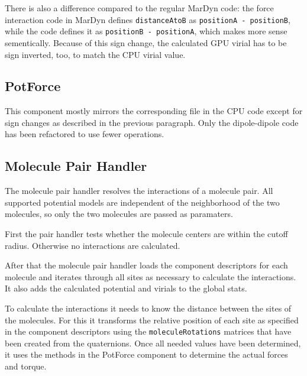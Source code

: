 There is also a difference compared to the regular MarDyn code: the force interaction code in MarDyn defines \lstinline!distanceAtoB! as \lstinline!positionA - positionB!, while the \cuda{} code defines it as \lstinline!positionB - positionA!, which makes more sense sementically. Because of this sign change, the calculated GPU virial has to be sign inverted, too, to match the CPU virial value.

\subsection{PotForce}
This component mostly mirrors the corresponding  file in the CPU code except for sign changes as described in the previous paragraph. Only the dipole-dipole code has been refactored to use fewer operations.

\subsection{Molecule Pair Handler}
The molecule pair handler resolves the interactions of a molecule pair. All supported potential models are independent of the neighborhood of the two molecules, so only the two molecules are passed as paramaters.

First the pair handler tests whether the molecule centers are within the cutoff radius. Otherwise no interactions are calculated.

After that the molecule pair handler loads the component descriptors for each molecule and iterates through all sites as necessary to calculate the interactions. It also adds the calculated potential and virials to the global stats.

To calculate the interactions it needs to know the distance between the sites of the molecules. For this it transforms the relative position of each site as specified in the component descriptors using the \lstinline!moleculeRotations! matrices that have been created from the quaternions. Once all needed values have been determined, it uses the methods in the PotForce component to determine the actual forces and torque.

